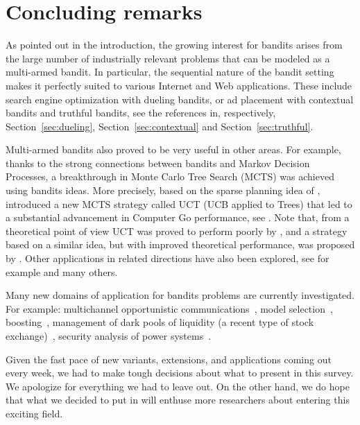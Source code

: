 \documentclass[11pt]{hackednow}
\begin{document}
\section{Concluding remarks}
As pointed out in the introduction, the growing interest for bandits arises from the large number of industrially relevant problems that can be modeled as a multi-armed bandit. In particular, the sequential nature of the bandit setting makes it perfectly suited to various Internet and Web applications. These include search engine optimization with dueling bandits, or ad placement with contextual bandits and truthful bandits, see the references in, respectively, Section~\ref{sec:dueling}, Section~\ref{sec:contextual} and Section~\ref{sec:truthful}.

Multi-armed bandits also proved to be very useful in other areas. For example, thanks to the strong connections between bandits and Markov Decision Processes, a breakthrough in Monte Carlo Tree Search (MCTS) was achieved using bandits ideas. More precisely, based on the sparse planning idea of \cite{KMN02}, \cite{KS06} introduced a new MCTS strategy called UCT (UCB applied to Trees) that led to a substantial advancement in Computer Go performance, see \cite{GWMT06}. Note that, from a theoretical point of view UCT was proved to perform poorly by \cite{CM07}, and a strategy based on a similar idea, but with improved theoretical performance, was proposed by \cite{BM10}. Other applications in related directions have also been explored, see for example \cite{TT09, HT10b} and many others.

Many new domains of application for bandits problems are currently investigated. For example: multichannel opportunistic communications~\cite{LZK10}, model selection~\cite{ADBL11}, boosting~\cite{BK11}, management of dark pools of liquidity (a recent type of stock exchange)~\cite{ABD10}, security analysis of power systems~\cite{BEG11}.

Given the fast pace of new variants, extensions, and applications coming out every week, we had to make tough decisions about what to present in this survey. We apologize for everything we had to leave out. On the other hand, we do hope that what we decided to put in will enthuse more researchers about entering this exciting field.


\end{document}

